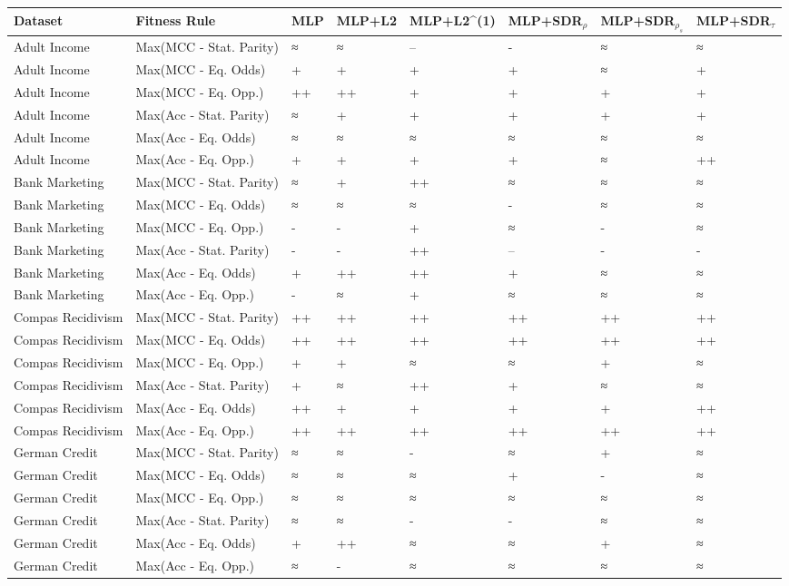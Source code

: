 \begin{tabular}{llllllll}
\toprule
Dataset & Fitness Rule & MLP & MLP+L2 & MLP+L2^{(1)} & MLP+SDR$_{\rho}$ & MLP+SDR$_{\rho_s}$ & MLP+SDR$_{\tau}$ \\
\midrule
Adult Income & Max(MCC - Stat. Parity) & ≈ & ≈ & -- & - & ≈ & ≈ \\
Adult Income & Max(MCC - Eq. Odds) & + & + & + & + & ≈ & + \\
Adult Income & Max(MCC - Eq. Opp.) & ++ & ++ & + & + & + & + \\
Adult Income & Max(Acc - Stat. Parity) & ≈ & + & + & + & + & + \\
Adult Income & Max(Acc - Eq. Odds) & ≈ & ≈ & ≈ & ≈ & ≈ & ≈ \\
Adult Income & Max(Acc - Eq. Opp.) & + & + & + & + & ≈ & ++ \\
Bank Marketing & Max(MCC - Stat. Parity) & ≈ & + & ++ & ≈ & ≈ & ≈ \\
Bank Marketing & Max(MCC - Eq. Odds) & ≈ & ≈ & ≈ & - & ≈ & ≈ \\
Bank Marketing & Max(MCC - Eq. Opp.) & - & - & + & ≈ & - & ≈ \\
Bank Marketing & Max(Acc - Stat. Parity) & - & - & ++ & -- & - & - \\
Bank Marketing & Max(Acc - Eq. Odds) & + & ++ & ++ & + & ≈ & ≈ \\
Bank Marketing & Max(Acc - Eq. Opp.) & - & ≈ & + & ≈ & ≈ & ≈ \\
Compas Recidivism & Max(MCC - Stat. Parity) & ++ & ++ & ++ & ++ & ++ & ++ \\
Compas Recidivism & Max(MCC - Eq. Odds) & ++ & ++ & ++ & ++ & ++ & ++ \\
Compas Recidivism & Max(MCC - Eq. Opp.) & + & + & ≈ & ≈ & + & ≈ \\
Compas Recidivism & Max(Acc - Stat. Parity) & + & ≈ & ++ & + & ≈ & ≈ \\
Compas Recidivism & Max(Acc - Eq. Odds) & ++ & + & + & + & + & ++ \\
Compas Recidivism & Max(Acc - Eq. Opp.) & ++ & ++ & ++ & ++ & ++ & ++ \\
German Credit & Max(MCC - Stat. Parity) & ≈ & ≈ & - & ≈ & + & ≈ \\
German Credit & Max(MCC - Eq. Odds) & ≈ & ≈ & ≈ & + & - & ≈ \\
German Credit & Max(MCC - Eq. Opp.) & ≈ & ≈ & ≈ & ≈ & ≈ & ≈ \\
German Credit & Max(Acc - Stat. Parity) & ≈ & ≈ & - & - & ≈ & ≈ \\
German Credit & Max(Acc - Eq. Odds) & + & ++ & ≈ & ≈ & + & ≈ \\
German Credit & Max(Acc - Eq. Opp.) & ≈ & - & ≈ & ≈ & ≈ & ≈ \\
\bottomrule
\end{tabular}
